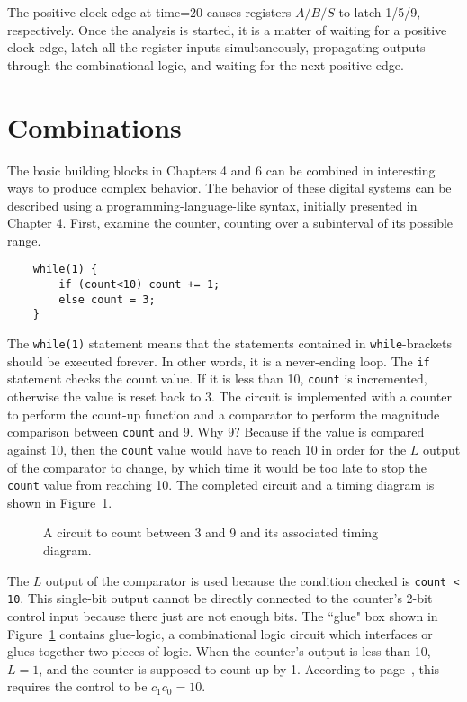 The positive clock edge at time=20 causes registers $A/B/S$ to latch 1/5/9,
respectively.  Once the analysis is started, it is a matter of waiting for a
positive clock edge, latch all the register inputs simultaneously, propagating
outputs through the combinational logic, and waiting for the next positive edge.


\section{Combinations}
The basic building blocks in Chapters 4 and 6 can be combined in interesting ways
to produce complex behavior.  The behavior of these digital systems can be described
using a programming-language-like syntax, initially presented in Chapter 4. First, examine
the counter, counting over a subinterval of its possible range.

\begin{verbatim}
    while(1) {
        if (count<10) count += 1;
        else count = 3;
    }
\end{verbatim}

The \verb+while(1)+ statement means that the statements contained
in \verb+while+-brackets should be executed forever.  In other
words, it is a never-ending loop.  The \verb+if+ statement checks
the count value. If it is less than 10, \verb+count+ is incremented,
otherwise the value is reset back to 3. The circuit is implemented
with a counter to perform the count-up function and a comparator
to perform the magnitude comparison between \verb+count+ and 9.
Why 9?  Because if the value is compared against 10, then the
\verb+count+ value would have to reach 10 in order for the $L$
output of the comparator to change, by which time it would be too
late to stop the \verb+count+ value from reaching 10.  The completed
circuit and a timing diagram is shown in Figure~\ref{fig:sequentialBBcomb1}.

\begin{figure}[ht]
\caption{A circuit to count between 3 and 9 and its associated timing diagram.}
\label{fig:sequentialBBcomb1}

\end{figure}

The $L$ output of the comparator is used because the condition checked is
\verb+count < 10+.  This single-bit output cannot be directly connected to the
counter's 2-bit control input because there just are not enough bits.  The
``glue" box shown in Figure~\ref{fig:sequentialBBcomb1} contains glue-logic, a
combinational logic circuit which interfaces or glues together two pieces
of logic.  When the counter's output is less than 10, $L=1$, and the
counter is supposed to count up by 1.  According to
page~\pageref{page:counter}, this requires the control to be $c_1c_0=10$.

